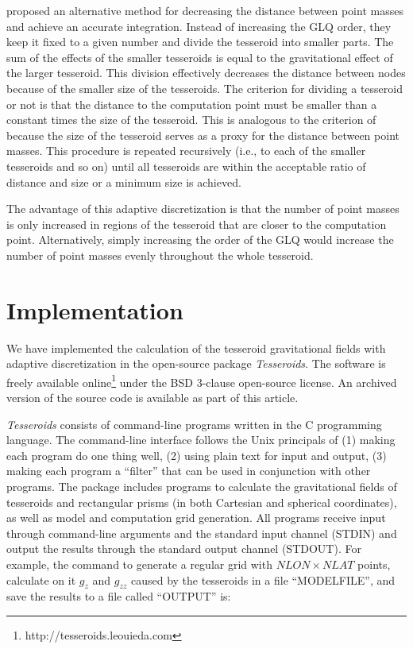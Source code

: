 \documentclass[paper,twocolumn]{geophysics}
\begin{document}
\citet{Li2011} proposed an alternative method
for decreasing the distance between point masses
and achieve an accurate integration.
Instead of increasing the GLQ order,
they keep it fixed to a given number
and divide the tesseroid into smaller parts.
The sum of the effects of the smaller tesseroids
is equal to the gravitational effect of the larger tesseroid.
This division effectively decreases
the distance between nodes because
of the smaller size of the tesseroids.
The criterion for dividing a tesseroid or not
is that the distance to the computation point
must be smaller than a constant times the size of the tesseroid.
This is analogous to the criterion of \citet{Ku1977}
because the size of the tesseroid serves as a proxy
for the distance between point masses.
This procedure is repeated recursively
(i.e., to each of the smaller tesseroids and so on)
until all tesseroids are within the acceptable
ratio of distance and size or a minimum size is achieved.


The advantage of this adaptive discretization is
that the number of point masses is only increased
in regions of the tesseroid that are
closer to the computation point.
Alternatively,
simply increasing the order of the GLQ
would increase the number of point masses
evenly throughout the whole tesseroid.

\section{Implementation}

We have implemented the calculation of
the tesseroid gravitational fields
with adaptive discretization
in the open-source package \textit{Tesseroids}.
The software is freely available
online\footnote{http://tesseroids.leouieda.com}
under the BSD 3-clause open-source license.
An archived version of the source code
is available as part of this article.

\textit{Tesseroids}  consists of command-line programs
written in the C programming language.
The command-line interface follows the Unix principals of
(1) making each program do one thing well,
(2) using plain text for input and output,
(3) making each program a ``filter'' that can be used in conjunction with other
programs.
The package includes programs to calculate
the gravitational fields of tesseroids and
rectangular prisms (in both Cartesian and spherical coordinates),
as well as model and computation grid generation.
All programs receive input through
command-line arguments and the standard input channel (STDIN)
and output the results through the standard output channel (STDOUT).
For example,
the command to generate a regular grid with $NLON \times NLAT$ points,
calculate on it $g_z$ and $g_{zz}$ caused by
the tesseroids in a file ``MODELFILE'',
and save the results to a file called ``OUTPUT''
is:
\end{document}
